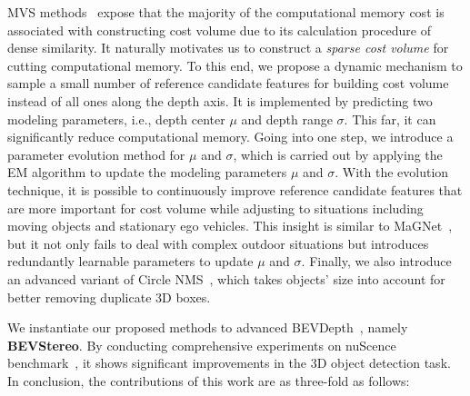 \documentclass[letterpaper]{article} \usepackage[]{aaai23}  \usepackage{times}  \usepackage{helvet}  \usepackage{courier}  \usepackage[hyphens]{url}  \usepackage{graphicx} \urlstyle{rm} \def\UrlFont{\rm}  \usepackage{natbib}  \usepackage{caption} \frenchspacing  \setlength{\pdfpagewidth}{8.5in} \setlength{\pdfpageheight}{11in} \usepackage{algorithm}
\begin{document}
MVS methods~\cite{wang2022monocular, wang2022mv} expose that the majority of the computational memory cost is associated with constructing cost volume due to its calculation procedure of dense similarity. It naturally motivates us to construct a \emph{sparse cost volume} for cutting computational memory. To this end, we propose a dynamic mechanism to sample a small number of reference candidate features for building cost volume instead of all ones along the depth axis. It is implemented by predicting two modeling parameters, i.e., depth center $\mu$ and depth range $\sigma$. This far, it can significantly reduce computational memory. Going into one step, we introduce a parameter evolution method for $\mu$ and $\sigma$, which is carried out by applying the EM algorithm to update the modeling parameters $\mu$ and $\sigma$. With the evolution technique, it is possible to continuously improve reference candidate features that are more important for cost volume while adjusting to situations including moving objects and stationary ego vehicles. This insight is similar to MaGNet~\cite{bae2022multi}, but it not only fails to deal with complex outdoor situations but introduces redundantly learnable parameters to update $\mu$ and $\sigma$. Finally, we also introduce an advanced variant of Circle NMS~\cite{yin2021center}, which takes objects' size into account for better removing duplicate 3D boxes.












We instantiate our proposed methods to advanced BEVDepth~\cite{li2022bevdepth}, namely \textbf{BEVStereo}. By conducting comprehensive experiments on nuScence benchmark~\cite{caesar2020nuscenes}, it shows significant improvements in the 3D object detection task. In conclusion, the contributions of this work are as three-fold as follows:
\end{document}
